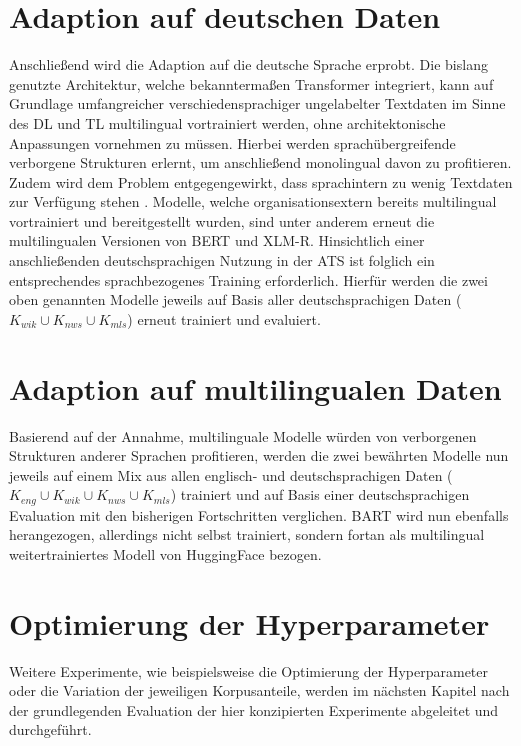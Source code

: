 \section{Adaption auf deutschen Daten}
\noindent
Anschließend wird die Adaption auf die deutsche Sprache erprobt. Die bislang genutzte Architektur, welche bekanntermaßen Transformer integriert, kann auf Grundlage umfangreicher verschiedensprachiger ungelabelter Textdaten im Sinne des \ac{DL} und \ac{TL} multilingual vortrainiert werden, ohne architektonische Anpassungen vornehmen zu müssen. Hierbei werden sprachübergreifende verborgene Strukturen erlernt, um anschließend monolingual davon zu profitieren. Zudem wird dem Problem entgegengewirkt, dass sprachintern zu wenig Textdaten zur Verfügung stehen \cite{MOB20}. Modelle, welche organisationsextern bereits multilingual vortrainiert und bereitgestellt wurden, sind unter anderem erneut die multilingualen Versionen von \ac{BERT} und \ac{XLM-R}. Hinsichtlich einer anschließenden deutschsprachigen Nutzung in der \ac{ATS} ist folglich ein entsprechendes sprachbezogenes Training erforderlich. Hierfür werden die zwei oben genannten Modelle jeweils auf Basis aller deutschsprachigen Daten ($K_{wik} \cup K_{nws} \cup K_{mls}$) erneut trainiert und evaluiert.


\section{Adaption auf multilingualen Daten}
\noindent
Basierend auf der Annahme, multilinguale Modelle würden von verborgenen Strukturen anderer Sprachen profitieren, werden die zwei bewährten Modelle nun jeweils auf einem Mix aus allen englisch- und deutschsprachigen Daten ($K_{eng} \cup K_{wik} \cup K_{nws} \cup K_{mls}$) trainiert und auf Basis einer deutschsprachigen Evaluation mit den bisherigen Fortschritten verglichen. \ac{BART} wird nun ebenfalls herangezogen, allerdings nicht selbst trainiert, sondern fortan als multilingual weitertrainiertes Modell von HuggingFace bezogen.
\newpage


\section{Optimierung der Hyperparameter}
\noindent
Weitere Experimente, wie beispielsweise die Optimierung der Hyperparameter oder die Variation der jeweiligen Korpusanteile, werden im nächsten Kapitel nach der grundlegenden Evaluation der hier konzipierten Experimente abgeleitet und durchgeführt.
